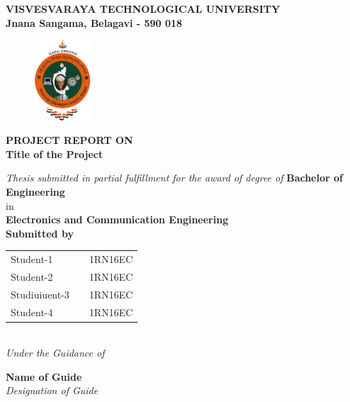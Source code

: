 
\begin{titlingpage}
\thispagestyle{empty}\centering

\setlength{\toptafiddle}{1in}
\setlength{\bottafiddle}{1in}
\vspace*{-1.25in}
\enlargethispage{\toptafiddle}
\large 
\textbf{VISVESVARAYA TECHNOLOGICAL UNIVERSITY\\
	Jnana Sangama, Belagavi - 590 018}\\
\vspace{0.2cm}
\begin{figure}[h]
\centering
\includegraphics[height=3cm]{images/vtu.png}
\end{figure}
{\textbf{PROJECT REPORT ON}}\\

\Huge{\textbf{\color{red}Title of the Project}}
\vspace{0.5cm}

\large \textit{Thesis submitted in partial fulfillment for the award of degree of }{\textbf{Bachelor of Engineering}}\\
in \\\textbf{Electronics and Communication Engineering}
\vspace{0.5cm}\\
{\textbf{Submitted by}}


\begin{tabular}{lll}

Student-1 & \hspace{5cm}  &1RN16EC\\
Student-2 &   &1RN16EC\\
Studiuiuent-3 &   &1RN16EC\\
Student-4 &   &1RN16EC\\

\end{tabular}
\vspace{0.5cm}\\
\textit{Under the Guidance of}


\Large{\textbf{Name of Guide}}\\
\textit{Designation of Guide}\\


\end{titlingpage}

